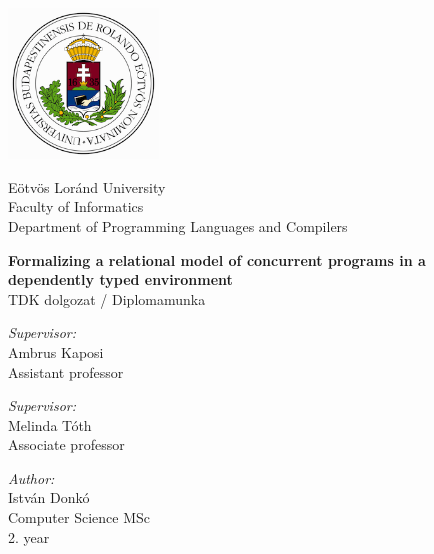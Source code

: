 \documentclass[runningheads,a4paper]{report}
\theoremstyle{definition}
\begin{document}


\begin{titlepage}
  \noindent
  \begin{minipage}{0.25 \textwidth}
    \includegraphics[height=40mm]{figures/cimer.png}
  \end{minipage}
  \hfill
  \begin{minipage}{0.67 \textwidth}
    \large
    Eötvös Loránd University \\
    Faculty of Informatics \\
    Department of Programming Languages and Compilers \\
    
  \end{minipage}

  \vfill

  \begin{center}
    {\LARGE \bfseries Formalizing a relational model of concurrent programs in a dependently typed environment}
    \\[1.5cm]
    {\Large TDK dolgozat / Diplomamunka}
    \\[3cm]
    \begin{minipage}[t]{0.45 \textwidth}
      \emph{Supervisor:} \\[0.25 \baselineskip]
      {\large Ambrus Kaposi} \\[0.5 \baselineskip]
      Assistant professor
      \vspace{1cm}
      
      \emph{Supervisor:} \\[0.25 \baselineskip]
      {\large Melinda Tóth} \\[0.5 \baselineskip]
      Associate professor
    \end{minipage}
    \begin{minipage}[t]{0.45 \textwidth}
      \begin{flushright}
        \emph{Author:} \\[0.25 \baselineskip]
        {\large István Donkó} \\[0.5 \baselineskip]
        Computer Science MSc \\ %
        2. year
      \end{flushright}
    \end{minipage}
  \end{center}


\end{titlepage}
\end{document}
